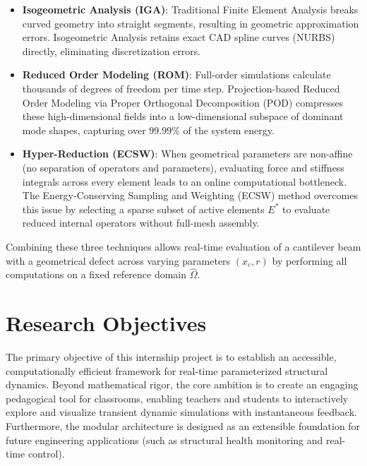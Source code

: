 \begin{itemize}[leftmargin=*]
    \item \textbf{Isogeometric Analysis (IGA)}: Traditional Finite Element Analysis breaks curved geometry into straight segments, resulting in geometric approximation errors. Isogeometric Analysis retains exact CAD spline curves (NURBS) directly, eliminating discretization errors.
    \item \textbf{Reduced Order Modeling (ROM)}: Full-order simulations calculate thousands of degrees of freedom per time step. Projection-based Reduced Order Modeling via Proper Orthogonal Decomposition (POD) compresses these high-dimensional fields into a low-dimensional subspace of dominant mode shapes, capturing over $99.99\%$ of the system energy.
    \item \textbf{Hyper-Reduction (ECSW)}: When geometrical parameters are non-affine (no separation of operators and parameters), evaluating force and stiffness integrals across every element leads to an online computational bottleneck. The Energy-Conserving Sampling and Weighting (ECSW) method overcomes this issue by selecting a sparse subset of active elements $E^*$ to evaluate reduced internal operators without full-mesh assembly.
\end{itemize}

Combining these three techniques allows real-time evaluation of a cantilever beam with a geometrical defect across varying parameters $(x_c, r)$ by performing all computations on a fixed reference domain $\hat{\Omega}$.

\section{Research Objectives}

The primary objective of this internship project is to establish an accessible, computationally efficient framework for real-time parameterized structural dynamics. Beyond mathematical rigor, the core ambition is to create an engaging pedagogical tool for classrooms, enabling teachers and students to interactively explore and visualize transient dynamic simulations with instantaneous feedback. Furthermore, the modular architecture is designed as an extensible foundation for future engineering applications (such as structural health monitoring and real-time control). 


